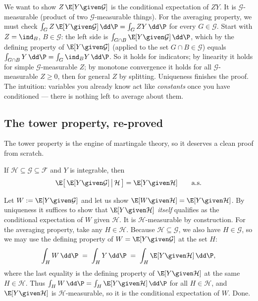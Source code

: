 \begin{whybox}
We want to show $Z\,\E[Y\given\mathcal{G}]$ is the conditional expectation of $ZY$. It is
$\mathcal{G}$-measurable (product of two $\mathcal{G}$-measurable things). For the averaging property,
we must check $\int_G Z\,\E[Y\given\mathcal{G}]\,\dd\P = \int_G ZY\,\dd\P$ for every $G \in
\mathcal{G}$. Start with $Z = \ind_B$, $B \in \mathcal{G}$: the left side is $\int_{G\cap B}
\E[Y\given\mathcal{G}]\,\dd\P$, which by the defining property of $\E[Y\given\mathcal{G}]$ (applied to
the set $G \cap B \in \mathcal{G}$) equals $\int_{G\cap B} Y\,\dd\P = \int_G \ind_B Y\,\dd\P$. So it
holds for indicators; by linearity it holds for simple $\mathcal{G}$-measurable $Z$; by monotone
convergence it holds for all $\mathcal{G}$-measurable $Z \ge 0$, then for general $Z$ by splitting.
Uniqueness finishes the proof. The intuition: variables you already know act like \emph{constants}
once you have conditioned --- there is nothing left to average about them.
\end{whybox}

\subsection{The tower property, re-proved}
\label{ch38:tower}

The tower property is the engine of martingale theory, so it deserves a clean proof from scratch.

\begin{theorem}
\label{ch38:thm-tower}
If $\mathcal{H} \subseteq \mathcal{G} \subseteq \mathcal{F}$ and $Y$ is integrable, then
\[
  \E\big[\,\E[Y\given\mathcal{G}] \,\big|\, \mathcal{H}\,\big] = \E[Y\given\mathcal{H}]
  \qquad \text{a.s.}
\]
\end{theorem}

\begin{whybox}
Let $W := \E[Y\given\mathcal{G}]$ and let us show $\E[W \given \mathcal{H}] = \E[Y\given\mathcal{H}]$.
By uniqueness it suffices to show that $\E[Y\given\mathcal{H}]$ \emph{itself} qualifies as the
conditional expectation of $W$ given $\mathcal{H}$. It is $\mathcal{H}$-measurable by construction.
For the averaging property, take any $H \in \mathcal{H}$. Because $\mathcal{H} \subseteq \mathcal{G}$,
we also have $H \in \mathcal{G}$, so we may use the defining property of $W = \E[Y\given\mathcal{G}]$
at the set $H$:
\[
  \int_H W \,\dd\P \;=\; \int_H Y \,\dd\P \;=\; \int_H \E[Y\given\mathcal{H}] \,\dd\P,
\]
where the last equality is the defining property of $\E[Y\given\mathcal{H}]$ at the same $H \in
\mathcal{H}$. Thus $\int_H W\,\dd\P = \int_H \E[Y\given\mathcal{H}]\,\dd\P$ for all $H \in
\mathcal{H}$, and $\E[Y\given\mathcal{H}]$ is $\mathcal{H}$-measurable, so it is the conditional
expectation of $W$. Done.
\end{whybox}

